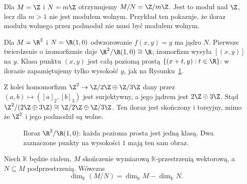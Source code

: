 \begin{przyklad}
Dla $M=\Z$ i $N=m\Z$ otrzymujemy $M/N=\Z/m\Z$.
Jest to moduł nad $\Z$, lecz dla $m>1$ nie jest modułem wolnym.
Przykład ten pokazuje, że iloraz modułu wolnego przez podmoduł
nie musi być modułem wolnym.

Dla $M=\R^2$ i $N=\R(1,0)$ odwzorowanie
$f(x,y)=y$ ma jądro $N$. Pierwsze twierdzenie
o izomorfizmie daje $\R^2/\R(1,0)\cong\R$;
izomorfizm wysyła $[(x,y)]$ na $y$.
Klasa punktu $(x,y)$ jest całą poziomą prostą
$\{(x+t,y):t\in\R\}$: w ilorazie zapamiętujemy tylko
wysokość $y$, jak na Rysunku~\ref{fig:modul-iloraz-poziome-5}.

Z kolei homomorfizm
$\Z^2\to\Z/2\Z\oplus\Z/3\Z$ dany przez
$(a,b)\mapsto([a]_2,[b]_3)$ jest surjektywny,
a jego jądrem jest $2\Z\oplus3\Z$. Stąd
$\Z^2/(2\Z\oplus3\Z)\cong\Z/2\Z\oplus\Z/3\Z$.
Ten iloraz jest skończony i torsyjny, mimo że
$\Z^2$ i jego podmoduł są wolne.
\end{przyklad}

\begin{figure}[htbp]
\centering
{}
\caption{Iloraz $\R^2/\R(1,0)$: każda pozioma prosta
jest jedną klasą. Dwa zaznaczone punkty na wysokości $1$
mają ten sam obraz.}
\label{fig:modul-iloraz-poziome-5}
\end{figure}

\begin{stwierdzenie}
\label{prop:wymiar-ilorazu}
Niech $\mathbb K$ będzie ciałem, $M$ skończenie wymiarową
$\mathbb K$-przestrzenią wektorową, a $N\subseteq M$ podprzestrzenią.
Wówczas
\[
\dim_{\mathbb K}(M/N)
=
\dim_{\mathbb K}M-\dim_{\mathbb K}N.
\]
\end{stwierdzenie}

